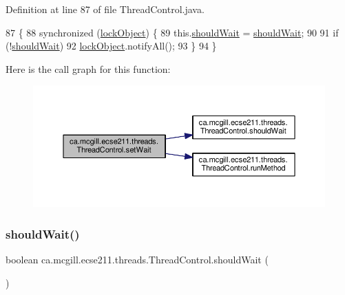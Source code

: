 Definition at line 87 of file Thread\+Control.\+java.


\begin{DoxyCode}
87                                           \{
88     \textcolor{keyword}{synchronized} (\hyperlink{classca_1_1mcgill_1_1ecse211_1_1threads_1_1_thread_control_ab20c44ff2dafab8981c42fa8bf634dfc}{lockObject}) \{
89       this.\hyperlink{classca_1_1mcgill_1_1ecse211_1_1threads_1_1_thread_control_a9c3896500e86e402b8019e1be6500621}{shouldWait} = \hyperlink{classca_1_1mcgill_1_1ecse211_1_1threads_1_1_thread_control_a9c3896500e86e402b8019e1be6500621}{shouldWait};
90 
91       \textcolor{keywordflow}{if} (!\hyperlink{classca_1_1mcgill_1_1ecse211_1_1threads_1_1_thread_control_a9c3896500e86e402b8019e1be6500621}{shouldWait})
92         \hyperlink{classca_1_1mcgill_1_1ecse211_1_1threads_1_1_thread_control_ab20c44ff2dafab8981c42fa8bf634dfc}{lockObject}.notifyAll();
93     \}
94   \}
\end{DoxyCode}
Here is the call graph for this function\+:\nopagebreak
\begin{figure}[H]
\begin{center}
\leavevmode
\includegraphics[width=350pt]{classca_1_1mcgill_1_1ecse211_1_1threads_1_1_thread_control_a7759a6f52b56e15cb37cd25ea31c93c1_cgraph}
\end{center}
\end{figure}
\mbox{\label{classca_1_1mcgill_1_1ecse211_1_1threads_1_1_thread_control_a9c3896500e86e402b8019e1be6500621}} 
\subsubsection{\texorpdfstring{should\+Wait()}{shouldWait()}}
{\footnotesize\ttfamily boolean ca.\+mcgill.\+ecse211.\+threads.\+Thread\+Control.\+should\+Wait (\begin{DoxyParamCaption}{ }\end{DoxyParamCaption})}

